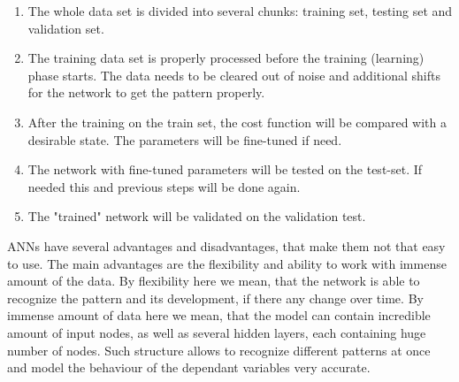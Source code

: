 \documentclass {article}
\begin{document}
\begin{enumerate}
	\item The whole data set is divided into several chunks: training set, testing set and validation set. 
	\item The training data set is properly processed before the training (learning) phase starts. The data needs to be cleared out of noise and additional shifts for the network to get the pattern properly.
	\item After the training on the train set, the cost function will be compared with a desirable state. The parameters will be fine-tuned if need.
	\item The network with fine-tuned parameters will be tested on the test-set. If needed this and previous steps will be done again.
	\item The "trained" network will be validated on the validation test.
\end{enumerate}
ANNs have several advantages and disadvantages, that make them not that easy to use. The main advantages are the flexibility and ability to work with immense amount of the data. By flexibility here we mean, that the network is able to recognize the pattern and its development, if there any change over time. By immense amount of data here we mean, that the model can contain incredible amount of input nodes, as well as several hidden layers, each containing huge number of nodes. Such structure allows to recognize different patterns at once and model the behaviour of the dependant variables very accurate.\\
\end{document}
